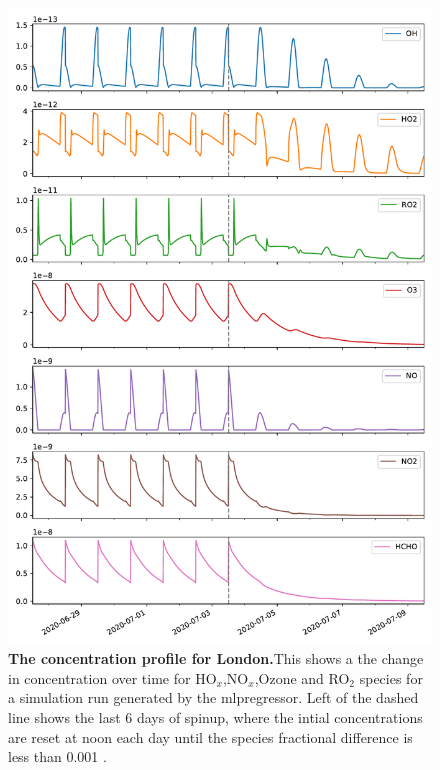 \begin{figure}[H]
    \centering
\includegraphics[width=.9\textwidth]{figures_c3/mlpregressor/conc_clfo.pdf}
\caption{\textbf{The concentration profile for London.}This shows a the change in concentration over time for HO$_x$,NO$_x$,Ozone and RO$_2$ species for a simulation run generated by the mlpregressor. Left of the dashed line shows the last 6 days of spinup, where the intial concentrations are reset at noon each day until the species fractional difference is less than 0.001 .}
\label{fig:clondon}
\end{figure}

\newpage


